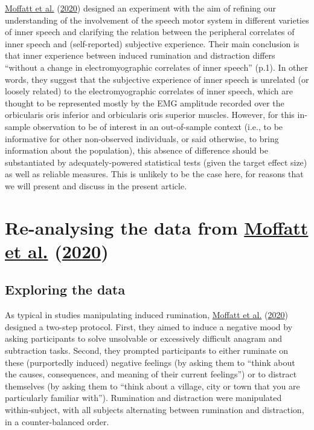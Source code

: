 \documentclass[
  english,
  man, donotrepeattitle,floatsintext]{apa6}
\begin{document}
\protect\hyperlink{ref-moffatt_inner_2020}{Moffatt et al.} (\protect\hyperlink{ref-moffatt_inner_2020}{2020}) designed an experiment with the aim of refining our understanding of the involvement of the speech motor system in different varieties of inner speech and clarifying the relation between the peripheral correlates of inner speech and (self-reported) subjective experience. Their main conclusion is that inner experience between induced rumination and distraction differs ``without a change in electromyographic correlates of inner speech'' (p.1). In other words, they suggest that the subjective experience of inner speech is unrelated (or loosely related) to the electromyographic correlates of inner speech, which are thought to be represented mostly by the EMG amplitude recorded over the orbicularis oris inferior and orbicularis oris superior muscles. However, for this in-sample observation to be of interest in an out-of-sample context (i.e., to be informative for other non-observed individuals, or said otherwise, to bring information about the population), this absence of difference should be substantiated by adequately-powered statistical tests (given the target effect size) as well as reliable measures. This is unlikely to be the case here, for reasons that we will present and discuss in the present article.

\hypertarget{re-analysing-the-data-from-moffatt_inner_2020}{%
\section{\texorpdfstring{Re-analysing the data from \protect\hyperlink{ref-moffatt_inner_2020}{Moffatt et al.} (\protect\hyperlink{ref-moffatt_inner_2020}{2020})}{Re-analysing the data from Moffatt et al. (2020)}}\label{re-analysing-the-data-from-moffatt_inner_2020}}

\hypertarget{exploring-the-data}{%
\subsection{Exploring the data}\label{exploring-the-data}}

As typical in studies manipulating induced rumination, \protect\hyperlink{ref-moffatt_inner_2020}{Moffatt et al.} (\protect\hyperlink{ref-moffatt_inner_2020}{2020}) designed a two-step protocol. First, they aimed to induce a negative mood by asking participants to solve unsolvable or excessively difficult anagram and subtraction tasks. Second, they prompted participants to either ruminate on these (purportedly induced) negative feelings (by asking them to ``think about the causes, consequences, and meaning of their current feelings'') or to distract themselves (by asking them to ``think about a village, city or town that you are particularly familiar with''). Rumination and distraction were manipulated within-subject, with all subjects alternating between rumination and distraction, in a counter-balanced order.
\end{document}
